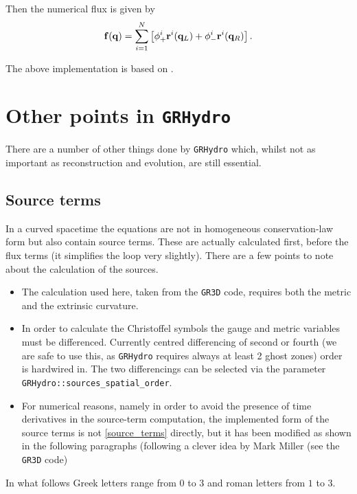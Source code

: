 \documentclass{article}
\begin{document}
Then the numerical flux is given by
\begin{equation}
  \label{marqflux}
  {\bf f}({\bf q}) = \sum_{i=1}^N \left[ {\bf \phi}^i_+ 
  {\bf r}^i ({\bf q}_L) + {\bf \phi}^i_- {\bf r}^i ({\bf q}_R)
  \right].
\end{equation}

The above implementation is based on \cite{Aloy99b}.


\section{Other points in {\tt GRHydro}}
\label{sec:misc}

There are a number of other things done by {\tt GRHydro} which, whilst not as
important as reconstruction and evolution, are still essential.


\subsection{Source terms}
\label{sec:sources}

In a curved spacetime the equations are not in homogeneous conservation-law 
form but also contain source terms. These are actually calculated
first, before the flux terms (it simplifies the loop very slightly).
There are a few points to note about the calculation of the sources.
\begin{itemize}
\item The calculation used here, taken from the {\tt GR3D} code, requires both the
  metric and the extrinsic curvature.
\item In order to calculate the Christoffel symbols the gauge and
  metric variables must be differenced. Currently centred differencing
  of second or fourth (we are safe to use this, as {\tt GRHydro} requires 
  always at least 2 ghost zones) order is hardwired in. The two differencings can be selected via
  the parameter {\tt GRHydro::sources\_spatial\_order}.
\item For numerical reasons, namely in order to avoid the presence of time derivatives
  in the source-term computation, the implemented form of the source terms is not
  \eqref{source_terms} directly, but it has been modified as shown in
  the following paragraphs (following a clever idea by Mark Miller (see the {\tt GR3D} code) 
\end{itemize}

In what follows Greek letters range from $0$ to $3$ and roman letters from $1$ to $3$.
\end{document}

